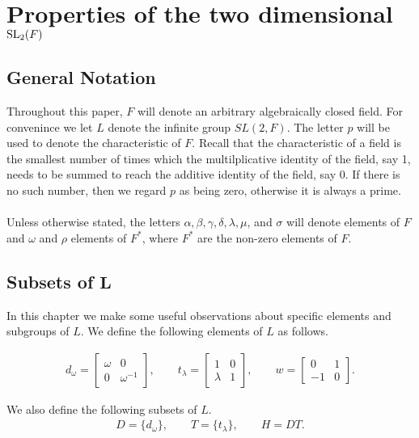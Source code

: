 \chapter{Properties of the two dimensional $\operatorname{SL}_2(F)$}\label{Ch3_PropertiesOfSLOverAlgClosedField}


\section{General Notation}

Throughout this paper, $F$ will denote an arbitrary algebraically closed field. For convenince we let $L$ denote the infinite group $SL(2,F)$. The letter $p$ will be used to denote the characteristic of $F$. Recall that the characteristic of a field is the smallest number of times which the multilplicative identity of the field, say 1, needs to be summed to reach the additive identity of the field, say 0. If there is no such number, then we regard $p$ as being zero, otherwise it is always a prime. \\
\\
Unless otherwise stated, the letters $\alpha, \beta, \gamma, \delta, \lambda, \mu$, and $\sigma$ will denote elements of $F$ and $\omega$ and $\rho$ elements of $F^*$, where $F^*$  are the non-zero elements of $F$.

\section[Subsets of $L$]{Subsets of $\pmb{L}$}

In this chapter we make some useful observations about specific elements and subgroups of $L$. We define the following elements of $L$ as follows.

\begin{align*} d_\omega = \begin{bmatrix} \omega & 0 \\ 0 & \omega^{-1} \end{bmatrix}, \qquad t_\lambda = \begin{bmatrix} 1 & 0 \\ \lambda & 1 \end{bmatrix}, \qquad w = \begin{bmatrix} 0 & 1 \\ - 1 & 0 \end{bmatrix}  \tag{$\omega \in F^*$ and $\lambda \in F$}.
\end{align*}

We also define the following subsets of $L$.
\begin{align*} D= \{d_\omega\}, \qquad T= \{t_\lambda\}, \qquad H=DT.
\end{align*}

